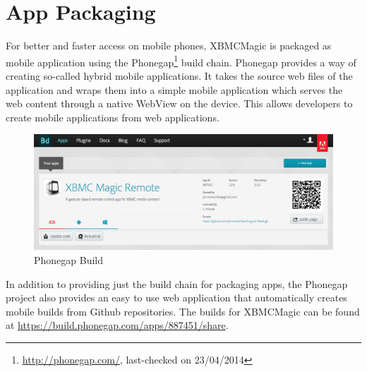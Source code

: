\section{App Packaging}

For better and faster access on mobile phones, XBMCMagic is packaged as mobile application using the Phonegap\footnote{\url{http://phonegap.com/}, last-checked on 23/04/2014} build chain. Phonegap provides a way of creating so-called hybrid mobile applications. It takes the source web files of the application and wraps them into a simple mobile application which serves the web content through a native WebView on the device. This allows developers to create mobile applications from web applications. 

\begin{figure}[htb]
  \centerline{
    \includegraphics[width=\linewidth]{images/phonegap_build.png}
  }
  \caption[Phonegap Build]{Phonegap Build}
  \label{fig:phonegap-build}
\end{figure}

In addition to providing just the build chain for packaging apps, the Phonegap project also provides an easy to use web application that automatically creates mobile builds from Github repositories. The builds for XBMCMagic can be found at \url{https://build.phonegap.com/apps/887451/share}.